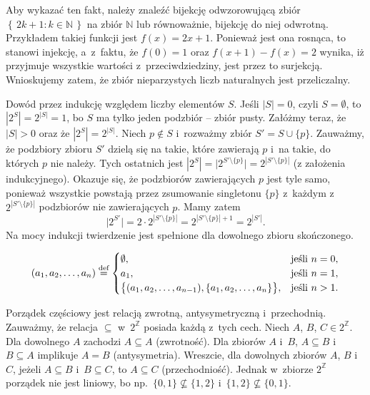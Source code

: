 \noindent Aby wykazać ten fakt, należy znaleźć bijekcję odwzorowującą zbiór $\left\{\,2k+1:k\in\mathbb{N}\,\right\}$ na zbiór $\mathbb{N}$ lub równoważnie, bijekcję do niej odwrotną. Przykładem takiej funkcji jest $f(x)=2x+1$. Ponieważ jest ona rosnąca, to stanowi injekcję, a~z~faktu, że $f(0)=1$ oraz $f(x+1)-f(x)=2$ wynika, iż przyjmuje wszystkie wartości z~przeciwdziedziny, jest przez to surjekcją. Wnioskujemy zatem, że zbiór nieparzystych liczb naturalnych jest przeliczalny.

\exercise %
Dowód przez indukcję względem liczby elementów $S$. Jeśli $|S|=0$, czyli $S=\emptyset$, to $|2^S|=2^{|S|}=1$, bo $S$ ma tylko jeden podzbiór -- zbiór pusty. Załóżmy teraz, że $|S|>0$ oraz że $|2^S|=2^{|S|}$. Niech $p\not\in S$ i~rozważmy zbiór $S'=S\cup\{p\}$. Zauważmy, że podzbiory zbioru $S'$ dzielą się na takie, które zawierają $p$ i~na takie, do których $p$ nie należy. Tych ostatnich jest $|2^S|=\bigl|2^{S'\setminus\{p\}}\bigr|=2^{\left|S'\setminus\{p\}\right|}$ (z założenia indukcyjnego). Okazuje się, że podzbiorów zawierających $p$ jest tyle samo, ponieważ wszystkie powstają przez zsumowanie singletonu $\{p\}$ z~każdym z~$2^{\left|S'\setminus\{p\}\right|}$ podzbiorów nie zawierających $p$. Mamy zatem
\[
	\bigl|2^{S'}\bigr|=2\cdot2^{\left|S'\setminus\{p\}\right|} = 2^{\left|S'\setminus\{p\}\right|+1} = 2^{|S'|}.
\]
Na mocy indukcji twierdzenie jest spełnione dla dowolnego zbioru skończonego.

\exercise %
\[
	(a_1,a_2,\dots,a_n)\stackrel{\text{\scriptsize def}}{=}
	\begin{cases}
		\emptyset, & \text{jeśli $n=0$}, \\
		a_1, & \text{jeśli $n=1$}, \\
		\bigl\{(a_1,a_2,\dots,a_{n-1}),\{a_1,a_2,\dots,a_n\}\bigr\}, & \text{jeśli $n>1$}.
	\end{cases}
\]


\exercise %
Porządek częściowy jest relacją zwrotną, antysymetryczną i~przechodnią. Zauważmy, że relacja $\subseteq$ w~$2^\mathbb{Z}$ posiada każdą z~tych cech. Niech $A$, $B$, $C\in2^\mathbb{Z}$. Dla dowolnego $A$ zachodzi $A\subseteq A$ (zwrotność). Dla zbiorów $A$ i~$B$, $A\subseteq B$ i~$B\subseteq A$ implikuje $A=B$ (antysymetria). Wreszcie, dla dowolnych zbiorów $A$, $B$ i~$C$, jeżeli $A\subseteq B$ i~$B\subseteq C$, to $A\subseteq C$ (przechodniość). Jednak w~zbiorze $2^\mathbb{Z}$ porządek nie jest liniowy, bo np.\ $\{0,1\}\not\subseteq\{1,2\}$ i~$\{1,2\}\not\subseteq\{0,1\}$.

